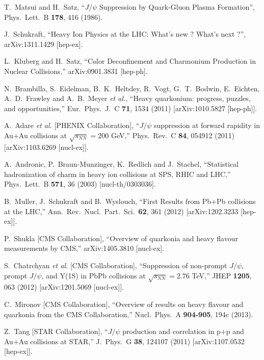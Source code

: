 \documentclass[aps,prc,preprint,superscriptaddress,showpacs,showkeys]{revtex4-1}
\begin{document}
\noindent
\begin{thebibliography}{100}
\medskip

 T.~Matsui and H.~Satz,
 ``$J/\psi$ Suppression by Quark-Gluon Plasma Formation'',
 Phys.\ Lett.\ B {\bf 178}, 416 (1986).

  J.~Schukraft,
  ``Heavy Ion Physics at the LHC: What's new ? What's next ?'',
  arXiv:1311.1429 [hep-ex].

  L.~Kluberg and H.~Satz,
  ``Color Deconfinement and Charmonium Production in Nuclear Collisions,''
  arXiv:0901.3831 [hep-ph].

  N.~Brambilla, S.~Eidelman, B.~K.~Heltsley, R.~Vogt, G.~T.~Bodwin, E.~Eichten, A.~D.~Frawley and A.~B.~Meyer {\it et al.},
  ``Heavy quarkonium: progress, puzzles, and opportunities,''
  Eur.\ Phys.\ J.\ C {\bf 71}, 1534 (2011)
  [arXiv:1010.5827 [hep-ph]].

  A.~Adare {\it et al.}  [PHENIX Collaboration],
  ``$J/\psi$ suppression at forward rapidity in Au+Au collisions at $\sqrt{s_{NN}}=200$ GeV,''
  Phys.\ Rev.\ C {\bf 84}, 054912 (2011)
  [arXiv:1103.6269 [nucl-ex]].

  A.~Andronic, P.~Braun-Munzinger, K.~Redlich and J.~Stachel,
  ``Statistical hadronization of charm in heavy ion collisions at SPS, RHIC and LHC,''
  Phys.\ Lett.\ B {\bf 571}, 36 (2003)
  [nucl-th/0303036].

  B.~Muller, J.~Schukraft and B.~Wyslouch,
  ``First Results from Pb+Pb collisions at the LHC,''
  Ann.\ Rev.\ Nucl.\ Part.\ Sci.\  {\bf 62}, 361 (2012)
  [arXiv:1202.3233 [hep-ex]].

  P.~Shukla [CMS Collaboration],
  ``Overview of quarkonia and heavy flavour measurements by CMS,''
  arXiv:1405.3810 [nucl-ex].

  S.~Chatrchyan {\it et al.}  [CMS Collaboration],
  ``Suppression of non-prompt $J/\psi$, prompt $J/\psi$, and Y(1S) in PbPb collisions at $\sqrt{s_{NN}}=2.76$ TeV,''
  JHEP {\bf 1205}, 063 (2012)
  [arXiv:1201.5069 [nucl-ex]].

  C.~Mironov [CMS Collaboration],
  ``Overview of results on heavy flavour and quarkonia from the CMS Collaboration,''
  Nucl.\ Phys.\ A {\bf 904-905}, 194c (2013).

  Z.~Tang [STAR Collaboration],
  ``$J/\psi$ production and correlation in p+p and Au+Au collisions at STAR,''
  J.\ Phys.\ G {\bf 38}, 124107 (2011)
  [arXiv:1107.0532 [hep-ex]].


\end{thebibliography}
\end{document}
